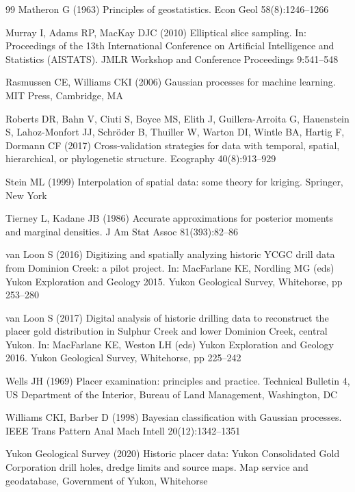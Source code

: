 \documentclass[11pt,a4paper]{article}
\theoremstyle{remark}
\begin{document}
\begin{thebibliography}{99}
Matheron G (1963) Principles of geostatistics. Econ Geol 58(8):1246--1266

Murray I, Adams RP, MacKay DJC (2010) Elliptical slice sampling. In: Proceedings of the 13th International Conference on Artificial Intelligence and Statistics (AISTATS). JMLR Workshop and Conference Proceedings 9:541--548

Rasmussen CE, Williams CKI (2006) Gaussian processes for machine learning. MIT Press, Cambridge, MA

Roberts DR, Bahn V, Ciuti S, Boyce MS, Elith J, Guillera-Arroita G, Hauenstein S, Lahoz-Monfort JJ, Schr{\"o}der B, Thuiller W, Warton DI, Wintle BA, Hartig F, Dormann CF (2017) Cross-validation strategies for data with temporal, spatial, hierarchical, or phylogenetic structure. Ecography 40(8):913--929

Stein ML (1999) Interpolation of spatial data: some theory for kriging. Springer, New York

Tierney L, Kadane JB (1986) Accurate approximations for posterior moments and marginal densities. J Am Stat Assoc 81(393):82--86

van Loon S (2016) Digitizing and spatially analyzing historic YCGC drill data from Dominion Creek: a pilot project. In: MacFarlane KE, Nordling MG (eds) Yukon Exploration and Geology 2015. Yukon Geological Survey, Whitehorse, pp 253--280

van Loon S (2017) Digital analysis of historic drilling data to reconstruct the placer gold distribution in Sulphur Creek and lower Dominion Creek, central Yukon. In: MacFarlane KE, Weston LH (eds) Yukon Exploration and Geology 2016. Yukon Geological Survey, Whitehorse, pp 225--242

Wells JH (1969) Placer examination: principles and practice. Technical Bulletin 4, US Department of the Interior, Bureau of Land Management, Washington, DC

Williams CKI, Barber D (1998) Bayesian classification with Gaussian processes. IEEE Trans Pattern Anal Mach Intell 20(12):1342--1351

Yukon Geological Survey (2020) Historic placer data: Yukon Consolidated Gold Corporation drill holes, dredge limits and source maps. Map service and geodatabase, Government of Yukon, Whitehorse

\end{thebibliography}
\end{document}
